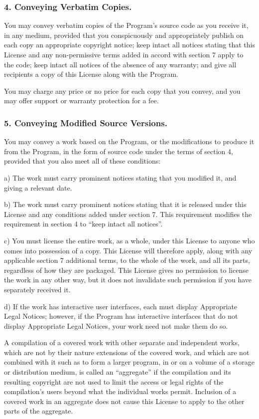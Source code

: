 \subsubsection{4. Conveying Verbatim Copies.}
You may convey verbatim copies of the Program's source code as you receive it, in any medium, provided that you conspicuously and appropriately publish on each copy an appropriate copyright notice; keep intact all notices stating that this License and any non-permissive terms added in accord with section 7 apply to the code; keep intact all notices of the absence of any warranty; and give all recipients a copy of this License along with the Program.\par
You may charge any price or no price for each copy that you convey, and you may offer support or warranty protection for a fee.
\subsubsection{5. Conveying Modified Source Versions.}
You may convey a work based on the Program, or the modifications to produce it from the Program, in the form of source code under the terms of section 4, provided that you also meet all of these conditions:\par
a) The work must carry prominent notices stating that you modified it, and giving a relevant date.\par
b) The work must carry prominent notices stating that it is released under this License and any conditions added under section 7. This requirement modifies the requirement in section 4 to “keep intact all notices”.\par
c) You must license the entire work, as a whole, under this License to anyone who comes into possession of a copy. This License will therefore apply, along with any applicable section 7 additional terms, to the whole of the work, and all its parts, regardless of how they are packaged. This License gives no permission to license the work in any other way, but it does not invalidate such permission if you have separately received it.\par
d) If the work has interactive user interfaces, each must display Appropriate Legal Notices; however, if the Program has interactive interfaces that do not display Appropriate Legal Notices, your work need not make them do so.\par
A compilation of a covered work with other separate and independent works, which are not by their nature extensions of the covered work, and which are not combined with it such as to form a larger program, in or on a volume of a storage or distribution medium, is called an “aggregate” if the compilation and its resulting copyright are not used to limit the access or legal rights of the compilation's users beyond what the individual works permit. Inclusion of a covered work in an aggregate does not cause this License to apply to the other parts of the aggregate.

